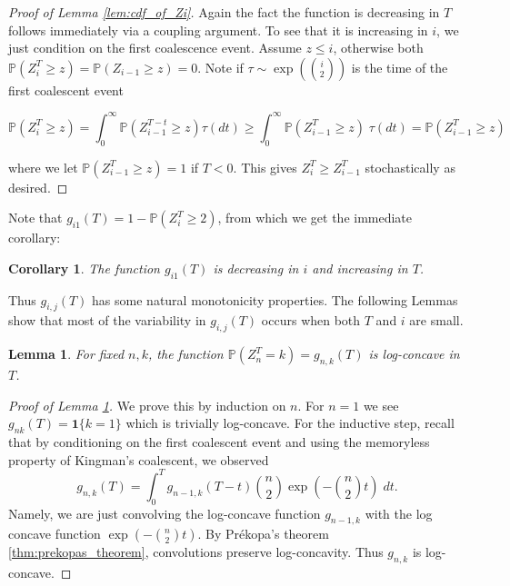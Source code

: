 \documentclass[10pt,oneside,reqno]{article}
\theoremstyle{plain}
\newtheorem{lemma}[theorem]{Lemma}
\newtheorem{corollary}[theorem]{Corollary}
\theoremstyle{definition}
\numberwithin{equation}{section}
\renewcommand{\leq}{\leqslant}
\renewcommand{\geq}{\geqslant}
\renewcommand{\P}{\mathbb{P}}
\newcommand{\ind}{\mathbf{1}}
\begin{document}
\begin{proof}[Proof of Lemma \ref{lem:cdf_of_Zi}] Again the fact the function is decreasing in $T$ follows immediately via a coupling argument. To see that it is increasing in $i$, we just condition on the first coalescence event. Assume $z \leq i$, otherwise both $\P(Z_i^T \geq z) = \P(Z_{i-1} \geq z) = 0$. Note if $\tau \sim \exp\left({i \choose 2}\right)$ is the time of the first coalescent event

\[\P(Z_i^T \geq z) = \int_0^\infty \P(Z_{i-1}^{T-t} \geq z) \tau(dt) \geq \int_0^\infty \P(Z_{i-1}^T \geq z) \; \tau(dt) = \P(Z_{i-1}^T \geq z)\]

\noindent where we let $\P(Z^{T}_{i-1} \geq z) = 1$ if $T < 0$. This gives $Z_i^T \geq Z_{i-1}^T$ stochastically as desired.
\end{proof}

\noindent Note that $g_{i1}(T) = 1 - \P(Z_i^T \geq 2)$, from which we get the immediate corollary:

\begin{corollary}
    The function $g_{i1}(T)$ is decreasing in $i$ and increasing in $T$.
    \label{corr:g_i1_is_decreasing}
\end{corollary}

 Thus $g_{i,j}(T)$ has some natural monotonicity properties. The following Lemmas show that most of the variability in $g_{i,j}(T)$ occurs when both $T$ and $i$ are small. 

    \begin{lemma}
        For fixed $n,k$, the function $\P(Z^T_n = k) = g_{n,k}(T)$ is log-concave in $T$. 
    \label{lem:log_concavity_gi(T)_in_T}
    \end{lemma}

    \begin{proof}[Proof of Lemma \ref{lem:log_concavity_gi(T)_in_T}]
    We prove this by induction on $n$. For $n=1$ we see $g_{nk}(T) = \ind\{k=1\}$ which is trivially log-concave. For the inductive step, recall that by conditioning on the first coalescent event and using the memoryless property of Kingman's coalescent, we observed
        \[g_{n,k}(T) = \int_0^T g_{n-1, k}(T-t) {n \choose 2} \exp\left(-{n \choose 2}t\right) \; dt. \]
    Namely, we are just convolving the log-concave function $g_{n-1,k}$ with the log concave function $\exp(-{n\choose 2}t)$. By Pr\'ekopa's theorem \ref{thm:prekopas_theorem}, convolutions preserve log-concavity. Thus $g_{n, k}$ is log-concave. 
    \end{proof}
\end{document}
